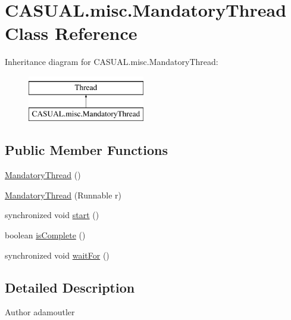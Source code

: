 \hypertarget{classCASUAL_1_1misc_1_1MandatoryThread}{\section{C\-A\-S\-U\-A\-L.\-misc.\-Mandatory\-Thread Class Reference}
\label{classCASUAL_1_1misc_1_1MandatoryThread}
}
Inheritance diagram for C\-A\-S\-U\-A\-L.\-misc.\-Mandatory\-Thread\-:\begin{figure}[H]
\begin{center}
\leavevmode
\includegraphics[height=2.000000cm]{classCASUAL_1_1misc_1_1MandatoryThread}
\end{center}
\end{figure}
\subsection*{Public Member Functions}
\begin{DoxyCompactItemize}
\item 
\hyperlink{classCASUAL_1_1misc_1_1MandatoryThread_a09160140c6e91ea2c5a14c264bc1fd85}{Mandatory\-Thread} ()
\item 
\hyperlink{classCASUAL_1_1misc_1_1MandatoryThread_ae74d0a4c148aa703b830d0890d666a7e}{Mandatory\-Thread} (Runnable r)
\item 
synchronized void \hyperlink{classCASUAL_1_1misc_1_1MandatoryThread_af99f45ee5d20c969c1d3edd167b334c7}{start} ()
\item 
boolean \hyperlink{classCASUAL_1_1misc_1_1MandatoryThread_af4c81c91c1927ed0f4fcab504ab2fe47}{is\-Complete} ()
\item 
synchronized void \hyperlink{classCASUAL_1_1misc_1_1MandatoryThread_a73dba51691a5c7a34fc584213e3a2121}{wait\-For} ()
\end{DoxyCompactItemize}


\subsection{Detailed Description}
\begin{DoxyAuthor}{Author}
adamoutler 
\end{DoxyAuthor}


